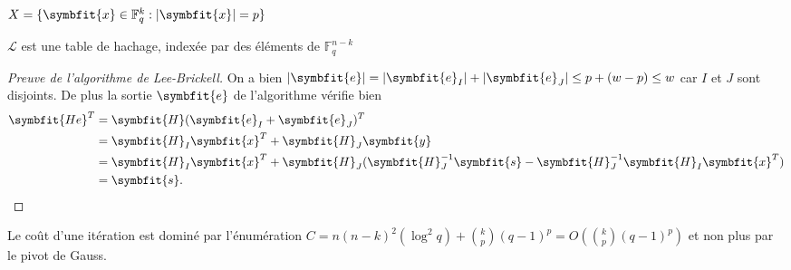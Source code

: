 \documentclass[a4paper,11pt,headings=small,footinclude=false]{scrartcl}
\theoremstyle{definition}
\theoremstyle{remark}
\begin{document}
\begin{algorithm}[H]
    \renewcommand{\algorithmcfname}{Algorithme}%
    \SetAlgoLined
    $X=\{ \symbfit{x}\in\mathbb{F}_q^{k} :|\symbfit{x}| = p \}$
    
    $\mathcal{L}$ est une table de hachage, indexée par des éléments de $\mathbb{F}_q^{n-k}$
    	
\caption{Algorithme de Lee-Brickell}
\end{algorithm}

\begin{proof}[Preuve de l'algorithme de Lee-Brickell]
On a bien $|\symbfit{e}|=|\symbfit{e}_I|+|\symbfit{e}_J|\leq p + (w - p)\leq w$ car $I$ et $J$ sont disjoints.
De plus la sortie $\symbfit{e}$ de l'algorithme vérifie bien
\begin{align*}
    \symbfit{He}^T &= \symbfit{H}(\symbfit{e}_I+\symbfit{e}_J)^T\\
    &= \symbfit{H}_I \symbfit{x}^T + \symbfit{H}_J \symbfit{y}\\
    &= \symbfit{H}_I \symbfit{x}^T + \symbfit{H}_J (\symbfit{H}_J^{-1}\symbfit{s} - \symbfit{H}_J^{-1}\symbfit{H}_I\symbfit{x}^T)\\
    &= \symbfit{s}.
\end{align*}
\end{proof}

Le coût d'une itération est dominé par l'énumération $C=n(n-k)^2(\log^2 q) + \binom{k}{p}(q-1)^p=O(\binom{k}{p}(q-1)^p)$ et non plus par le pivot de Gauss. 
\end{document}
